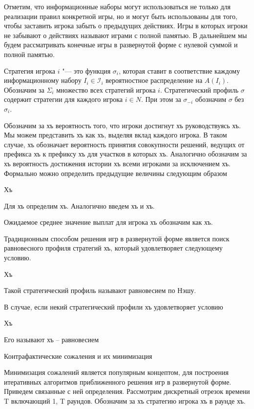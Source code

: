 \par
 Отметим, что информационные наборы могут использоваться не только для реализации правил конкретной игры, но и могут быть использованы для того, чтобы заставить игрока забыть о предыдущих действиях. Игры в которых игроки не забывают о действиях называют играми с полной памятью. В дальнейшем мы будем рассматривать конечные игры в развернутой форме с нулевой суммой и полной памятью.

Стратегия игрока $i$ "--- это функция $\sigma_i$, которая ставит в соответствие каждому информационному набору $I_i \in \mathcal{I}_i$ вероятностное распределение на $A(I_i)$. Обозначим за $\Sigma_i$ множество всех стратегий игрока $i$. Стратегический профиль $\sigma$ содержит стратегии для каждого игрока $i \in N$. При этом за $\sigma_{-i}$ обозначим $\sigma$ без $\sigma_i$. 

Обозначим за хъ вероятность того, что игроки достигнут хъ руководствуясь хъ. Мы можем представить хъ как хъ, выделяя вклад каждого игрока. В таком случае, хъ обозначает вероятность принятия совокупности решений, ведущих от префикса хъ к префиксу хъ для участков в которых хъ. Аналогично обозначим за хъ вероятность достижения истории хъ всеми игроками за исключением хъ. Формально можно определить предыдущие величины следующим образом 

Хъ 

Для хъ определим хъ. Аналогично введем хъ и хъ. 

Ожидаемое среднее значение выплат для игрока хъ обозначим как хъ. 

Традиционным способом решения игр в развернутой форме является поиск равновесного профиля стратегий хъ, который удовлетворяет следующему условию. 

Хъ 

Такой стратегический профиль называют равновесием по Нэшу. 

В случае, если некий стратегический профили хъ удовлетворяет условию 

Хъ 

Его называют хъ – равновесием 



Контрафактические сожаления и их минимизация 

Минимизация сожалений является популярным концептом, для построения итеративных алгоритмов приближенного решения игр в развернутой форме. Приведем связанные с ней определения. Рассмотрим дискретный отрезок времени T включающий 1, T раундов. Обозначим за хъ стратегию игрока хъ в раунде хъ. 


